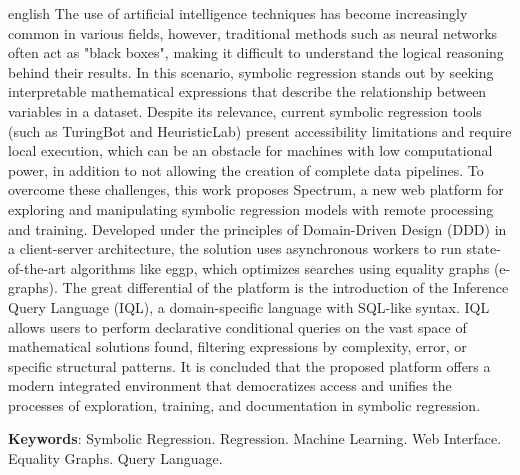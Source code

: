 \documentclass[
  12pt,
  oneside,
  a4paper,
  chapter=TITLE,
  section=TITLE,
  subsection=TITLE,
  subsubsection=TITLE,
  english,
  brazil,
]{abntex2}
\begin{document}
\begin{resumo}[Abstract]
  \begin{otherlanguage*}{english}
The use of artificial intelligence techniques has become increasingly common in various fields, however, traditional methods such as neural networks often act as "black boxes", making it difficult to understand the logical reasoning behind their results. In this scenario, symbolic regression stands out by seeking interpretable mathematical expressions that describe the relationship between variables in a dataset. Despite its relevance, current symbolic regression tools (such as TuringBot and HeuristicLab) present accessibility limitations and require local execution, which can be an obstacle for machines with low computational power, in addition to not allowing the creation of complete data pipelines. To overcome these challenges, this work proposes Spectrum, a new web platform for exploring and manipulating symbolic regression models with remote processing and training. Developed under the principles of Domain-Driven Design (DDD) in a client-server architecture, the solution uses asynchronous workers to run state-of-the-art algorithms like eggp, which optimizes searches using equality graphs (e-graphs). The great differential of the platform is the introduction of the Inference Query Language (IQL), a domain-specific language with SQL-like syntax. IQL allows users to perform declarative conditional queries on the vast space of mathematical solutions found, filtering expressions by complexity, error, or specific structural patterns. It is concluded that the proposed platform offers a modern integrated environment that democratizes access and unifies the processes of exploration, training, and documentation in symbolic regression.

    \vspace{\onelineskip}
    \noindent
    \textbf{Keywords}: Symbolic Regression. Regression. Machine Learning. Web Interface. Equality Graphs. Query Language.
  \end{otherlanguage*}
\end{resumo}

\tableofcontents*
\cleardoublepage

\listoffigures
\cleardoublepage
\listoftables
\cleardoublepage
\lstlistoflistings
\cleardoublepage

\textual









\postextual
\printbibliography


\end{document}
